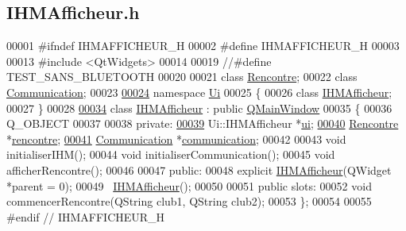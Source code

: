 \hypertarget{_i_h_m_afficheur_8h_source}{}\subsection{I\+H\+M\+Afficheur.\+h}

\begin{DoxyCode}
00001 \textcolor{preprocessor}{#ifndef IHMAFFICHEUR\_H}
00002 \textcolor{preprocessor}{#define IHMAFFICHEUR\_H}
00003 
00013 \textcolor{preprocessor}{#include <QtWidgets>}
00014 
00019 \textcolor{comment}{//#define TEST\_SANS\_BLUETOOTH}
00020 
00021 \textcolor{keyword}{class }\hyperlink{class_rencontre}{Rencontre};
00022 \textcolor{keyword}{class }\hyperlink{class_communication}{Communication};
00023 
\hyperlink{namespace_ui}{00024} \textcolor{keyword}{namespace }\hyperlink{namespace_ui}{Ui}
00025 \{
00026     \textcolor{keyword}{class }\hyperlink{class_i_h_m_afficheur}{IHMAfficheur};
00027 \}
00028 
\hyperlink{class_i_h_m_afficheur}{00034} \textcolor{keyword}{class }\hyperlink{class_i_h_m_afficheur}{IHMAfficheur} : \textcolor{keyword}{public} \hyperlink{class_q_main_window}{QMainWindow}
00035 \{
00036     Q\_OBJECT
00037 
00038 \textcolor{keyword}{private}:
\hyperlink{class_i_h_m_afficheur_a26ca43f1ff87b1caa2191adcce444d23}{00039}     Ui::IHMAfficheur *\hyperlink{class_i_h_m_afficheur_a26ca43f1ff87b1caa2191adcce444d23}{ui};           
\hyperlink{class_i_h_m_afficheur_aef34d340f7ea30f049a98efc47bd9779}{00040}     \hyperlink{class_rencontre}{Rencontre} *\hyperlink{class_i_h_m_afficheur_aef34d340f7ea30f049a98efc47bd9779}{rencontre};
\hyperlink{class_i_h_m_afficheur_a331b5544e96cc908336a1486b52c379b}{00041}     \hyperlink{class_communication}{Communication} *\hyperlink{class_i_h_m_afficheur_a331b5544e96cc908336a1486b52c379b}{communication};
00042 
00043     \textcolor{keywordtype}{void} initialiserIHM();
00044     \textcolor{keywordtype}{void} initialiserCommunication();
00045     \textcolor{keywordtype}{void} afficherRencontre();
00046 
00047 \textcolor{keyword}{public}:
00048     \textcolor{keyword}{explicit} \hyperlink{class_i_h_m_afficheur}{IHMAfficheur}(QWidget *parent = 0);
00049     ~\hyperlink{class_i_h_m_afficheur}{IHMAfficheur}();
00050 
00051 \textcolor{keyword}{public} slots:
00052     \textcolor{keywordtype}{void} commencerRencontre(QString club1, QString club2);
00053 \};
00054 
00055 \textcolor{preprocessor}{#endif // IHMAFFICHEUR\_H}
\end{DoxyCode}
